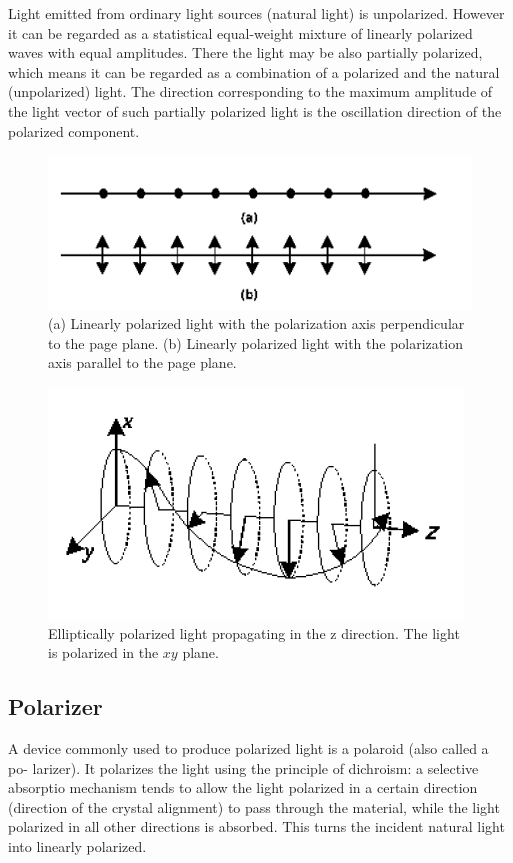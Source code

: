 \documentclass{article}
\begin{document}
Light emitted from ordinary light sources (natural light) is unpolarized. However it can be regarded as a statistical equal-weight mixture of linearly polarized waves with equal amplitudes. There the light may be also partially polarized, which means it can be regarded as a combination of a polarized and the natural (unpolarized) light. The direction corresponding to the maximum amplitude of the light vector of such partially polarized light is the oscillation direction of the polarized component.
\begin{figure}[H]
	\centering
	\includegraphics[scale=0.5]{1.png}
	\caption{(a) Linearly polarized light with the polarization axis perpendicular to the page plane. (b) Linearly polarized light with the polarization axis parallel to the page plane.}
\end{figure}
\begin{figure}[H]
	\centering
	\includegraphics[scale=0.5]{2.png}
	\caption{Elliptically polarized light propagating in the z direction. The light is polarized in the $ xy $ plane.}
\end{figure}

\subsection{Polarizer}
A device commonly used to produce polarized light is a polaroid (also called a po-
larizer). It polarizes the light using the principle of dichroism: a selective absorptio mechanism tends to allow the light polarized in a certain direction (direction of the crystal alignment) to pass through the material, while the light polarized in all other directions is absorbed. This turns the incident natural light into linearly polarized.
\end{document}

